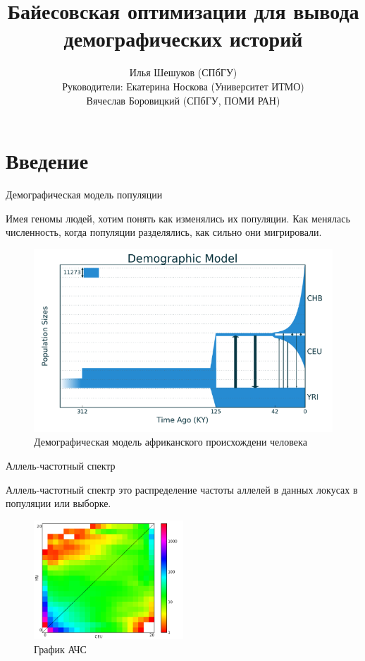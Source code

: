 \documentclass[
  russian,
  ignorenonframetext,
]{beamer}
\title{Байесовская оптимизации для вывода демографических историй}
\author[Илья Шешуков]{Илья Шешуков (СПбГУ)\\[10mm]{\small Руководители: Екатерина Носкова (Университет ИТМО) \\ \phantom{Руководители:} Вячеслав Боровицкий (СПбГУ, ПОМИ РАН) }}
\date{}
\begin{document}
\frame{\titlepage}

\hypertarget{ux432ux432ux435ux434ux435ux43dux438ux435}{%
\section{Введение}\label{ux432ux432ux435ux434ux435ux43dux438ux435}}

\begin{frame}{Демографическая модель популяции}
\protect\hypertarget{ux434ux435ux43cux43eux433ux440ux430ux444ux438ux447ux435ux441ux43aux430ux44f-ux43cux43eux434ux435ux43bux44c-ux43fux43eux43fux443ux43bux44fux446ux438ux438}{}

Имея геномы людей, хотим понять как изменялись их популяции. Как
менялась численность, когда популяции разделялись, как сильно они
мигрировали.

\begin{figure}
\centering
\includegraphics[width=\textwidth,height=0.4\textheight]{./pics/outofafrica.png}
\caption{Демографическая модель африканского происхождени человека}
\end{figure}

\end{frame}

\begin{frame}{Аллель-частотный спектр}
\protect\hypertarget{ux430ux43bux43bux435ux43bux44c-ux447ux430ux441ux442ux43eux442ux43dux44bux439-ux441ux43fux435ux43aux442ux440-1}{}

Аллель-частотный спектр это распределение частоты аллелей в данных
локусах в популяции или выборке.

\begin{figure}
\centering
\includegraphics[width=0.5\textwidth,height=\textheight]{./pics/sfs.png}
\caption{График АЧС}
\end{figure}

\end{frame}
\end{document}
